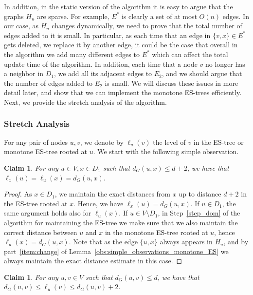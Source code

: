 \documentclass[11pt]{article}
\newtheorem{claim}[theorem]{Claim}
\theoremstyle{definition}
\theoremstyle{remark}
\newcommand{\ytodo}[1]{\todo[color=blue!20]{Y: #1}}
\newcommand{\mtodo}[1]{\todo[color=red!20]{M: #1}}
\begin{document}
In addition, in the static version of the algorithm it is easy to argue that the graphs $H_u$ are sparse. For example, $E^*$ is clearly a set of at most $O(n)$ edges. In our case, as $H_u$ changes dynamically, we need to prove that the total number of edges added to it is small.
In particular, as each time that an edge in $\{v,x\} \in E^*$ gets deleted, we replace it by another edge, it could be the case that overall in the algorithm we add many different edges to $E^*$ which can affect the total update time of the algorithm. In addition, each time that a node $v$ no longer has a neighbor in $D_1$, we add all its adjacent edges to $E_2$, and we should argue that the number of edges added to $E_2$ is small.
We will discuss these issues in more detail later, and show that we can implement the monotone ES-trees efficiently. 
Next, we provide the stretch analysis of the algorithm.

\subsubsection{Stretch Analysis} \label{sec:add_warmup_stretch} %
For any pair of nodes $u,v$, we denote by $\ell_u(v)$ the level of $v$ in the ES-tree or monotone ES-tree rooted at $u$. We start with the following simple observation. 
\begin{claim}\label{obs:stretch_warmup}
For any $u \in V, x \in D_1$ such that $d_G(u,x) \leq d+2$, we have that $\ell_x(u)=\ell_u(x)=d_G(u,x).$
\end{claim} 

\begin{proof}
As $x \in D_1$, we maintain the exact distances from $x$ up to distance $d+2$ in the ES-tree rooted at $x$. Hence, we have $\ell_x(u)=d_G(u,x)$. If $u \in D_1$, the same argument holds also for $\ell_u(x)$. If $u \in V \setminus D_1$, in Step~\ref{step_dom} of the algorithm for maintaining the ES-tree we make sure that we also maintain the correct distance between $u$ and $x$ in the monotone ES-tree rooted at $u$, hence $\ell_u(x)=d_G(u,x)$. Note that as the edge $\{u,x\}$ always appears in $H_u$, and by part~\ref{item:change} of Lemma~\ref{obs:simple_observations_monotone_ES} we always maintain the exact distance estimate in this case.
\end{proof}


\begin{claim}\label{claim:stretch_warmup}
For any $u,v \in V$ such that $d_G(u,v) \leq d$, we have that $d_G(u,v) \leq \ell_u(v) \leq d_G(u,v) +2.$
\end{claim}
\end{document}
